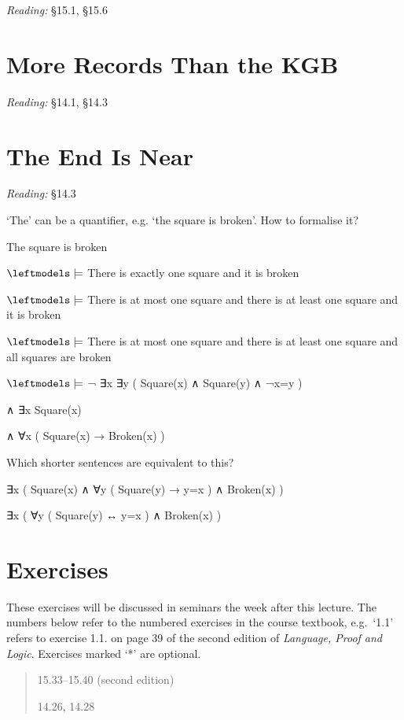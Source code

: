 \documentclass[12pt]{extarticle}
\begin{document}
\begin{multicols*}{3}
\emph{Reading:} §15.1, §15.6
 
 
 
\section{More Records Than the KGB}
 
\emph{Reading:} §14.1, §14.3
 
 
 
\section{The End Is Near}
 
\emph{Reading:} §14.3
 
‘The’ can be a quantifier, e.g. ‘the square is broken’. How to formalise it?
 
The square is broken
 
$\leftmodels\models$ There is exactly one square and it is broken
 
$\leftmodels\models$ There is at most one square and there is at least one square and it is broken
 
$\leftmodels\models$ There is at most one square and there is at least one square and all squares are broken
 
$\leftmodels\models$ ¬ ∃x ∃y ( Square(x) ∧ Square(y) ∧ ¬x=y )
 
\hspace{5mm} ∧ ∃x Square(x)
 
\hspace{5mm} ∧ ∀x ( Square(x) → Broken(x) )
 
Which shorter sentences are equivalent to this?
 
∃x ( Square(x) ∧ ∀y ( Square(y) → y=x ) ∧ Broken(x) )
 
∃x ( ∀y ( Square(y) ↔ y=x ) ∧ Broken(x) )
 
\vfill
\begin{minipage}{\columnwidth}
\section{Exercises}
These exercises will be discussed in seminars the week after this lecture.
The numbers below refer to the numbered exercises in the course textbook, e.g.\ `1.1' refers to exercise 1.1. on page 39 of the second edition of \emph{Language, Proof and Logic}. Exercises marked `*' are optional.
 
\begin{quote}
15.33--15.40 (second edition)
 
14.26, 14.28
 
\end{quote}
\end{minipage}

 


\end{multicols*}
\end{document}
